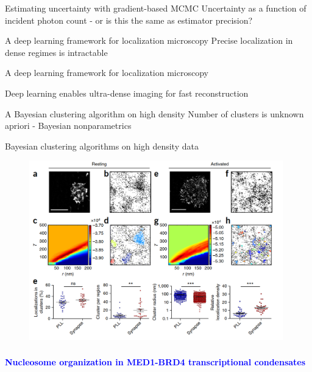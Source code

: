 \documentclass{beamer}					%
\begin{document}
\begin{frame}{Estimating uncertainty with gradient-based MCMC}
Uncertainty as a function of incident photon count - or is this the same as estimator precision?
\end{frame}

\begin{frame}{A deep learning framework for localization microscopy}
Precise localization in dense regimes is intractable

\end{frame}

\begin{frame}{A deep learning framework for localization microscopy}
\end{frame}

\begin{frame}{Deep learning enables ultra-dense imaging for fast reconstruction}

\end{frame}


\begin{frame}{A Bayesian clustering algorithm on high density}
Number of clusters is unknown apriori - Bayesian nonparametrics
\end{frame}

\begin{frame}{Bayesian clustering algorithms on high density data}
\begin{figure}
\includegraphics[width=11cm]{Cluster.png}
\end{figure}
\end{frame}

\begin{frame}
\frametitle{}
\centering
\Large \textbf{\textcolor{blue}{Nucleosome organization in MED1-BRD4 transcriptional condensates}}
\end{frame}
\end{document}
